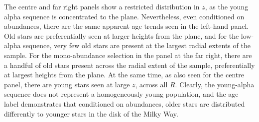 \documentclass[12pt, preprint]{aastex}
\newcommand{\project}[1]{\textsl{#1}}
\newcommand{\apogee}{\project{\textsc{apogee}}}
\newcommand{\alphafe}{\mbox{$\rm [\alpha/Fe]$}}
\begin{document}
The centre and far right panels show a restricted distribution in  $z$, as the young alpha sequence is concentrated to the plane. Nevertheless, even conditioned on abundances, there are the same apparent age trends seen in the left-hand panel. Old stars are preferentially seen at larger heights from the plane, and for the low-alpha sequence, very few old stars are present at the largest radial extents of the sample. For the mono-abundance selection in the panel at the far right, there are a handful of old stars present across the radial extent of the sample, preferentially at largest heights from the plane. At the same time, as also seen for the centre panel, there are young stars seen at large $z$, across all $R$. Clearly, the young-alpha sequence does not represent a homogeneously young population, and the age label demonstrates that conditioned on abundances, older stars are distributed differently to younger stars in the disk of the Milky Way. 

%



%    
\end{document}
